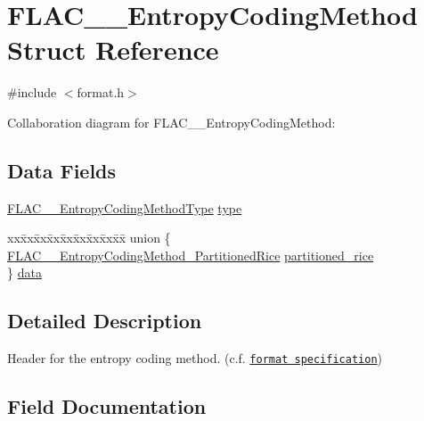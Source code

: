 \hypertarget{struct_f_l_a_c_____entropy_coding_method}{}\section{F\+L\+A\+C\+\_\+\+\_\+\+Entropy\+Coding\+Method Struct Reference}
\label{struct_f_l_a_c_____entropy_coding_method}


{\ttfamily \#include $<$format.\+h$>$}



Collaboration diagram for F\+L\+A\+C\+\_\+\+\_\+\+Entropy\+Coding\+Method\+:
\subsection*{Data Fields}
\begin{DoxyCompactItemize}
\item 
\hyperlink{group__flac__format_ga951733d2ea01943514290012cd622d3a}{F\+L\+A\+C\+\_\+\+\_\+\+Entropy\+Coding\+Method\+Type} \hyperlink{struct_f_l_a_c_____entropy_coding_method_abe41e84858fd130777b7cc3c27e400f8}{type}
\item 
\begin{tabbing}
xx\=xx\=xx\=xx\=xx\=xx\=xx\=xx\=xx\=\kill
union \{\\
\>\hyperlink{struct_f_l_a_c_____entropy_coding_method___partitioned_rice}{FLAC\_\_EntropyCodingMethod\_PartitionedRice} \hyperlink{struct_f_l_a_c_____entropy_coding_method_a41d493a19d5c01ec7a06a5b3d83adf8b}{partitioned\_rice}\\
\} \hyperlink{struct_f_l_a_c_____entropy_coding_method_a54a46c0ca98e350ce8177db52014a453}{data}\\

\end{tabbing}\end{DoxyCompactItemize}


\subsection{Detailed Description}
Header for the entropy coding method. (c.\+f. \href{../format.html#residual}{\tt format specification}) 

\subsection{Field Documentation}
\mbox{\label{struct_f_l_a_c_____entropy_coding_method_a54a46c0ca98e350ce8177db52014a453}} 
